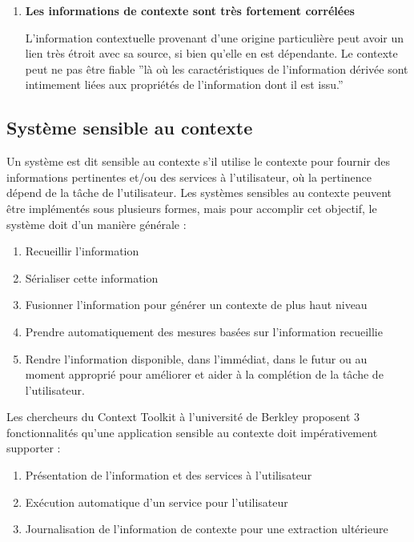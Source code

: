 \begin{enumerate}
    \item \textbf{Les informations de contexte sont très fortement corrélées}

        L'information contextuelle provenant d'une origine particulière peut
        avoir un lien très étroit avec sa source, si bien qu'elle en est
        dépendante. Le contexte peut ne pas être fiable ''là où les
        caractéristiques de l'information dérivée sont intimement liées aux
        propriétés de l'information dont il est issu.''
        \cite{catharina_context_2002}

\end{enumerate}

\subsection{Système sensible au contexte}

Un système est dit sensible au contexte s'il utilise le contexte pour fournir
des informations pertinentes et/ou des services à l'utilisateur, où la
pertinence dépend de la tâche de l'utilisateur. Les systèmes sensibles au
contexte peuvent être implémentés sous plusieurs formes, mais pour accomplir
cet objectif, le système doit d'un manière générale :

\begin{enumerate}
    \item Recueillir l'information
    \item Sérialiser cette information
    \item Fusionner l'information pour générer un contexte de plus haut niveau
    \item Prendre automatiquement des mesures basées sur l'information
        recueillie
    \item Rendre l'information disponible, dans l'immédiat, dans le futur ou au
        moment approprié pour améliorer et aider à la complétion de la tâche de
        l'utilisateur.
\end{enumerate}

Les chercheurs du Context Toolkit à l'université de Berkley proposent 3
fonctionnalités qu'une application sensible au contexte doit impérativement
supporter : \cite{dey_providing_2000}

\begin{enumerate}
    \item Présentation de l'information et des services à l'utilisateur
    \item Exécution automatique d'un service pour l'utilisateur
    \item Journalisation de l'information de contexte pour une extraction
        ultérieure
\end{enumerate}

